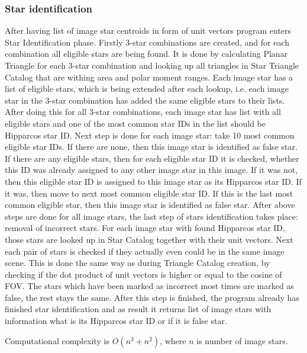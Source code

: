 \documentclass[12pt,a4paper,oneside]{article}
\begin{document}
\subsubsection{Star identification}
After having list of image star centroids in form of unit vectors program enters Star Identification phase. Firstly 3-star combinations are created, and for each combination all eligible stars are being found. It is done by calculating Planar Triangle for each 3-star combination and looking up all triangles in Star Triangle Catalog that are withing area and polar moment ranges. Each image star has a list of eligible stars, which is being extended after each lookup, i.e. each image star in the 3-star combination has added the same eligible stars to their lists. After doing this for all 3-star combinations, each image star has list with all eligible stars and one of the most common star IDs in the list should be Hipparcos star ID. Next step is done for each image star: take 10 most common eligible star IDs. If there are none, then this image star is identified as false star. If there are any eligible stars, then for each eligible star ID it is checked, whether this ID was already assigned to any other image star in this image. If it was not, then this eligible star ID is assigned to this image star as its Hipparcos star ID. If it was, then move to next most common eligible star ID. If this is the last most common eligible star, then this image star is identified as false star. After above steps are done for all image stars, the last step of stars identification takes place: removal of incorrect stars. For each image star with found Hipparcos star ID, those stars are looked up in Star Catalog together with their unit vectors. Next each pair of stars is checked if they actually even could be in the same image scene. This is done the same way as during Triangle Catalog creation, by checking if the dot product of unit vectors is higher or equal to the cosine of FOV. The stars which have been marked as incorrect most times are marked as false, the rest stays the same. After this step is finished, the program already has finished star identification and as result it returns list of image stars with information what is its Hipparcos star ID or if it is false star.

Computational complexity is $O(n^3+n^2)$, where $n$ is number of image stars.
\end{document}
